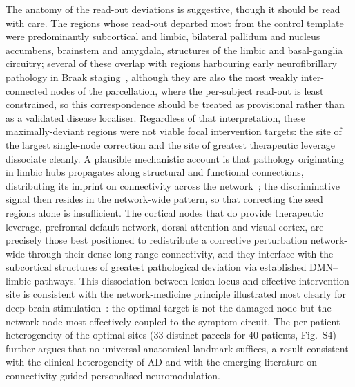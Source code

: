 \documentclass[11pt]{article}
\begin{document}
The anatomy of the read-out deviations is suggestive, though it should be read
with care. The regions whose read-out departed most from the control template
were predominantly subcortical and limbic, bilateral pallidum and nucleus
accumbens, brainstem and amygdala, structures of the limbic and basal-ganglia
circuitry; several of these overlap with regions harbouring early neurofibrillary
pathology in Braak staging~\cite{braak1991,braak2011}, although they are also the
most weakly inter-connected nodes of the parcellation, where the per-subject
read-out is least constrained, so this correspondence should be treated as
provisional rather than as a validated disease localiser. Regardless of that
interpretation, these maximally-deviant regions were not viable focal
intervention targets: the site of the largest single-node correction and the site
of greatest therapeutic leverage dissociate cleanly. A plausible mechanistic account is that pathology
originating in limbic hubs propagates along structural and functional connections,
distributing its imprint on connectivity across the network~\cite{raj2012,vogel2020};
the discriminative signal then resides in the network-wide pattern, so that
correcting the seed regions alone is insufficient. The cortical nodes that do
provide therapeutic leverage, prefrontal default-network, dorsal-attention and
visual cortex, are precisely those best positioned to redistribute a corrective
perturbation network-wide through their dense long-range connectivity, and they
interface with the subcortical structures of greatest pathological deviation via
established DMN--limbic pathways. This dissociation between lesion locus and
effective intervention site is consistent with the network-medicine principle
illustrated most clearly for deep-brain stimulation~\cite{fox2014}: the optimal
target is not the damaged node but the network node most effectively coupled to
the symptom circuit. The per-patient heterogeneity of the optimal sites (33
distinct parcels for 40 patients, Fig.~S4) further argues that no universal
anatomical landmark suffices, a result consistent with the clinical heterogeneity
of AD and with the emerging literature on connectivity-guided personalised
neuromodulation.
\end{document}
